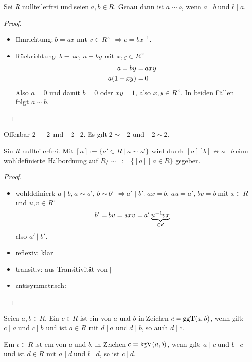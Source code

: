 \begin{lemma}
	Sei $R$ nullteilerfrei und seien $a,b\in R$. Genau dann ist $a\sim b$, wenn $a\mid b$ und $b\mid a$.
\end{lemma}
\begin{proof}
	\begin{itemize}
		\item Hinrichtung: $b=ax$ mit $x\in R^\times$ $\Rightarrow a=bx^{-1}$.
		\item Rückrichtung: $b=ax$, $a=by$ mit $x,y\in R^\times$
		\begin{align}
			a=by&=axy \notag \\
			a(1-xy)&= 0 \notag
		\end{align}
		Also $a=0$ und damit $b=0$ oder $xy=1$, also $x,y\in R^\times$. In beiden Fällen folgt $a\sim b$.
	\end{itemize}
\end{proof}

\begin{*example}
	Offenbar $2\mid -2$ und $-2\mid 2$. Es gilt $2\sim -2$ und $-2\sim 2$.
\end{*example}

\begin{proposition}
	Sie $R$ nullteilerfrei. Mit $[a] := \{a'\in R\mid a\sim a'\}$
	wird durch $[a][b]\iff a\mid b$ eine wohldefinierte Halbordnung auf $R/\sim\; := \{[a]\mid a\in R\}$
	gegeben.
\end{proposition}
\begin{proof}
	\begin{itemize}
		\item wohldefiniert: $a\mid b$, $a\sim a'$, $b\sim b'$ $\Rightarrow a'\mid b'$: $ax=b$, $au=a'$, $bv=b$ mit $x\in R$ und $u,v\in R^\times$
		\begin{align}
			b'=bv=axv=a'\underbrace{u^{-1}vx}_{\in R}\notag
		\end{align}
		also $a'\mid b'$.
		\item reflexiv: klar
		\item transitiv: aus Transitivität von $\mid$
		\item antisymmetrisch: 
	\end{itemize}
\end{proof}

\begin{definition}
	Seien $a,b\in R$. Ein $c\in R$ ist ein  von $a$ und $b$ in Zeichen $c=\operatorname{ggT}(a,b)$, wenn gilt: $c\mid a$ und $c\mid b$ und ist $d\in R$ mit $d\mid a$ und $d\mid b$, so auch $d\mid c$.
	
	Ein $c\in R$ ist ein  von $a$ und $b$, in Zeichen $c=\operatorname{kgV}(a,b)$, wenn gilt: $a\mid c$ und $b\mid c$ und ist $d\in R$ mit $a\mid d$ und $b\mid d$, so ist $c\mid d$.
\end{definition}

